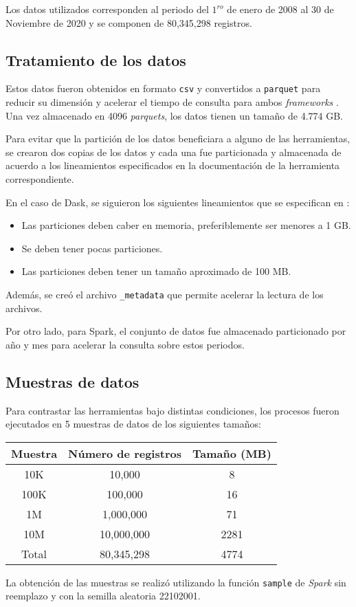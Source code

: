 Los datos utilizados corresponden al periodo del $1^{ro}$ de enero de 2008 al 30 de Noviembre de 2020 y se componen de 80,345,298 registros. 

\subsection{Tratamiento de los datos}

Estos datos fueron obtenidos en formato \texttt{csv} y convertidos a \texttt{parquet} para reducir su dimensión y acelerar el tiempo de consulta para ambos \textit{frameworks} . Una vez almacenado en 4096 \textit{parquets}, los datos tienen un tamaño de 4.774 GB.

Para evitar que la partición de los datos beneficiara a alguno de las herramientas, se crearon dos copias de los datos y cada una fue particionada y almacenada de acuerdo a los lineamientos especificados en la documentación de la herramienta correspondiente.

En el caso de Dask, se siguieron los siguientes lineamientos que se especifican en \cite{daskbestpractices}:
\begin{itemize}
	\item Las particiones deben caber en memoria, preferiblemente ser menores a 1 GB.
	\item Se deben tener pocas particiones.
	\item Las particiones deben tener un tamaño aproximado de 100 MB.
\end{itemize}

Además, se creó el archivo \texttt{\_metadata} que permite acelerar la lectura de los archivos.

Por otro lado, para Spark, el conjunto de datos fue almacenado particionado por año y mes para acelerar la consulta sobre estos periodos.

\subsection{Muestras de datos}

Para contrastar las herramientas bajo distintas condiciones, los procesos fueron ejecutados en 5 muestras de datos de los siguientes tamaños:\\

\begin{center}
\begin{tabular}{|ccc|}
  \hline
 Muestra & Número de registros & Tamaño (MB) \\ 
  \hline
  10K & 10,000 & 8 \\ 
  100K & 100,000 & 16 \\ 
  1M & 1,000,000 & 71 \\ 
  10M & 10,000,000 & 2281 \\ 
  Total & 80,345,298 & 4774 \\ 
   \hline
\end{tabular}
\end{center}

La obtención de las muestras se realizó utilizando la función \texttt{sample} de \textit{Spark} sin reemplazo y con la semilla aleatoria 22102001.